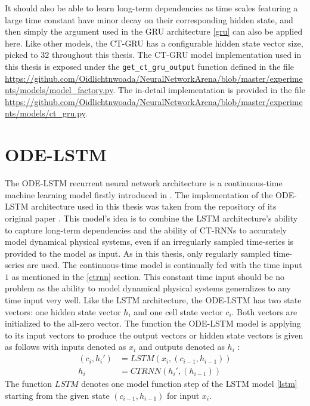 \documentclass[draft,final]{vutinfth} %
\begin{document}
    It should also be able to learn long-term dependencies as time scales featuring a large time constant have minor decay on their corresponding hidden state, and then simply the argument used in the GRU architecture \ref{gru} can also be applied here.
    Like other models, the CT-GRU has a configurable hidden state vector size, picked to $32$ throughout this thesis.
    The CT-GRU model implementation used in this thesis is exposed under the \texttt{get\_ct\_gru\_output} function defined in the file \url{https://github.com/Oidlichtnwoada/NeuralNetworkArena/blob/master/experiments/models/model_factory.py}.
    The in-detail implementation is provided in the file \url{https://github.com/Oidlichtnwoada/NeuralNetworkArena/blob/master/experiments/models/ct_gru.py}.

    \section{ODE-LSTM} \label{odelstm}
    The ODE-LSTM recurrent neural network architecture is a continuous-time machine learning model firstly introduced in \cite{ODELSTM}.
    The implementation of the ODE-LSTM architecture used in this thesis was taken from the repository of its original paper \cite{ODELSTM}.
    This model's idea is to combine the LSTM architecture's ability to capture long-term dependencies and the ability of CT-RNNs to accurately model dynamical physical systems, even if an irregularly sampled time-series is provided to the model as input.
    As in this thesis, only regularly sampled time-series are used. The continuous-time model is continually fed with the time input $1$ as mentioned in the \ref{ctrnn} section. 
    This constant time input should be no problem as the ability to model dynamical physical systems generalizes to any time input very well.
    Like the LSTM architecture, the ODE-LSTM has two state vectors: one hidden state vector $h_i$ and one cell state vector $c_i$. Both vectors are initialized to the all-zero vector.
    The function the ODE-LSTM model is applying to its input vectors to produce the output vectors or hidden state vectors is given as follows with inputs denoted as $x_i$ and outputs denoted as $h_i$ \cite[p. 5]{ODELSTM}:
    \begin{align}
    (c_i,h_i') &= LSTM(x_i, (c_{i-1}, h_{i-1})) \\
    h_i &= CTRNN(h_i', (h_{i-1}))
    \end{align}
    The function $LSTM$ denotes one model function step of the LSTM model \ref{lstm} starting from the given state $(c_{i-1}, h_{i-1})$ for input $x_i$.
\end{document}
